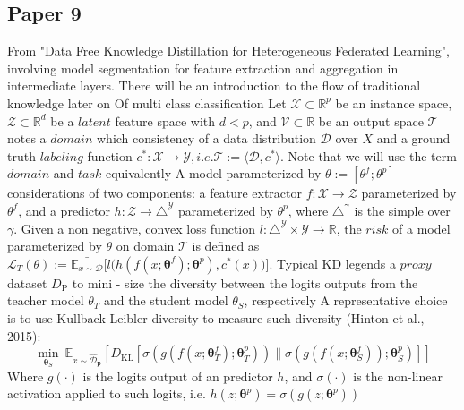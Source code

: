 \subsection{Paper 9}
From "Data Free Knowledge Distillation for Heterogeneous Federated Learning", involving model segmentation for feature extraction and aggregation in intermediate layers. There will be an introduction to the flow of traditional knowledge later on
Of multi class classification Let $\mathcal{X}\subset\mathbb{R}^p$ be an instance space, $\mathcal{Z}\subset\mathbb{R}^d$ be a $latent$ feature space with $d<p$, and $\mathcal{V}\subset\mathbb{R}$ be an output space $\mathcal{T}$ notes a $domain$ which consistency of a data distribution $\mathcal{D}$ over $X$ and a ground truth $labeling$ function $c^*:\mathcal{X}\to\mathcal{Y},i.e.\mathcal{T}:=\langle\mathcal{D},c^*\rangle$. Note that we will use the term $domain$ and $task$ equivalently A model parameterized by $\theta:=[\theta^f;\theta^p]$ considerations of two components: a feature extractor $f:\mathcal{X}\to\mathcal{Z}$ parameterized by $\theta^f$, and a predictor $h:\mathcal{Z}\to\triangle^\mathcal{Y}$ parameterized by $\theta^p$, where $\triangle^\mathrm{\gamma}$ is the simple over $\gamma$. Given a non negative, convex loss function $l:\triangle^{\mathcal{Y}}\times\mathcal{Y}\to\mathbb{R}$, the $risk$ of a model parameterized by $\theta$ on domain $\mathcal{T}$ is defined as $\mathcal{L}_T(\theta):=
\bar{\mathbb{E}_{x\sim\mathcal{D}}}\big[l\big(h(f(x;\boldsymbol{\theta}^{f});\boldsymbol{\theta}^{p}),c^{*}(x)\big)\big].
$
Typical KD legends a $proxy$ dataset $D_\mathrm{P}$ to mini - size the diversity between the logits outputs from the teacher model $\theta_T$ and the student model $\theta_S$, respectively A representative choice is to use Kullback Leibler diversity to measure such diversity (Hinton et al., 2015):
\begin{equation*}
\operatorname*{\min}_{\boldsymbol{\theta}_{S}}\:\mathbb{E}_{x\sim\hat{\mathcal{D}}_{\mathbf{p}}}\left[D_{\mathrm{KL}}\left[\sigma(g(f(x;\boldsymbol{\theta}_{T}^{f});\boldsymbol{\theta}_{T}^{p}))\|\sigma(g(f(x;\boldsymbol{\theta}_{S}^{f}));\boldsymbol{\theta}_{S}^{p})\right]\right]
\end{equation*}
Where $g(\cdot)$ is the logits output of an predictor $h$, and $\sigma(\cdot)$ is the non-linear activation applied to such logits, i.e. $h(z;\boldsymbol{\theta}^p)=\sigma(g(z;\boldsymbol{\theta}^p))$
